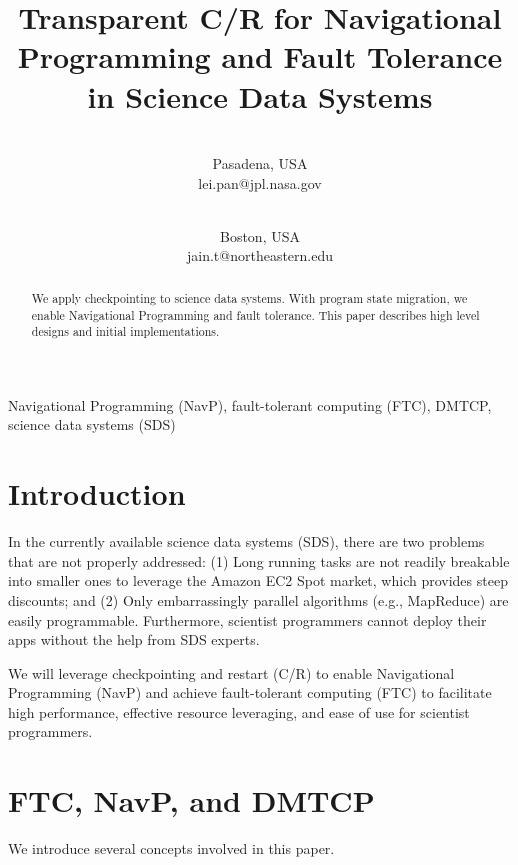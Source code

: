 \documentclass[conference]{IEEEtran}
\begin{document}
\title{Transparent C/R for Navigational Programming and Fault Tolerance in Science Data Systems}


\author{
 \\
Pasadena, USA\\
lei.pan@jpl.nasa.gov\\
\and
{}
 \\
Boston, USA\\
jain.t@northeastern.edu}

\maketitle

\begin{abstract}
We apply checkpointing to science data systems. With program state migration, we enable Navigational Programming and fault tolerance. This paper describes high level designs and initial implementations.
\end{abstract}

\begin{IEEEkeywords}
Navigational Programming (NavP), fault-tolerant computing (FTC), DMTCP, science data systems (SDS)
\end{IEEEkeywords}
\vspace{-2.2mm}
\section{Introduction}
\label{sec:introduction}
In the currently available science data systems (SDS), there are two problems that are not properly addressed: (1) Long running tasks are not readily breakable into smaller ones to leverage the Amazon EC2 Spot market, which provides steep discounts; and (2) Only embarrassingly parallel algorithms (e.g., MapReduce) are easily programmable. Furthermore, scientist programmers cannot deploy their apps without the help from SDS experts.

We will leverage checkpointing and restart (C/R) to enable Navigational Programming (NavP) and achieve fault-tolerant computing (FTC) to facilitate high performance, effective resource leveraging, and ease of use for scientist programmers.

\section{FTC, NavP, and DMTCP}
\label{sec:s1}
We introduce several concepts involved in this paper.
\end{document}
